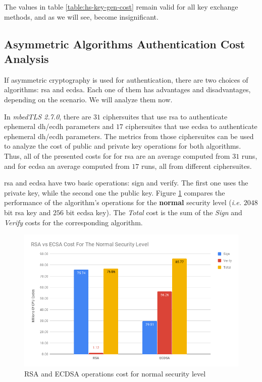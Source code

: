 \documentclass{llncs}
\begin{document}
The values in table \ref{table:hs-key-gen-cost} remain valid for all key exchange methods, and as we will see,
become insignificant.

\subsection{Asymmetric Algorithms Authentication Cost Analysis} \label{sec:asym-algs-analysis}

If asymmetric cryptography is used for authentication, there are two
choices of algorithms: \gls{rsa} and \gls{ecdsa}. Each one of them has advantages and disadvantages, depending on the
scenario. We will analyze them now.

In \textit{mbedTLS 2.7.0}, there are $31$ ciphersuites that use \gls{rsa} to authenticate ephemeral \gls{dh}/\gls{ecdh} parameters
and $17$ ciphersuites that use \gls{ecdsa} to authenticate ephemeral \gls{dh}/\gls{ecdh} parameters. The metrics from those
ciphersuites can be used to analyze the cost of public and private key operations for both algorithms. Thus, all of the presented
costs for for \gls{rsa} are an average computed from $31$ runs, and for \gls{ecdsa} an average computed from $17$ runs, all from
different ciphersuites.

\gls{rsa} and \gls{ecdsa} have two basic operations: sign and verify. The first one uses the private key, while the
second one the public key. Figure \ref{fig:rsa-ecdsa-sign-ver-total-normal-sl} compares the performance of the algorithm's
operations for the \textbf{normal} security level (\textit{i.e.} $2048$ bit \gls{rsa} key and $256$ bit \gls{ecdsa} key).
The \textit{Total} cost is the sum of the \textit{Sign} and \textit{Verify} costs for the corresponding algorithm.

\begin{figure}
  \centering
  \includegraphics[width=1.0\textwidth]{img/rsa_ecdsa_cost_normal_sl.png}
  \centering \caption{\label{fig:rsa-ecdsa-sign-ver-total-normal-sl} RSA and ECDSA operations cost for normal security level}
\end{figure}
\end{document}
